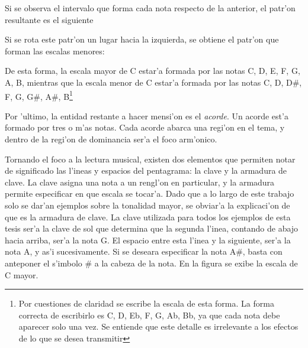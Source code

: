 Si se observa el intervalo que forma cada nota respecto de la anterior, el patr'on resultante es el siguiente

\begin{center}
      
\end{center}

Si se rota este patr'on un lugar hacia la izquierda, se obtiene el patr'on que forman las escalas menores:

\begin{center}
       
\end{center}

De esta forma, la escala mayor de C estar'a formada por las notas C, D, E, F, G, A, B, mientras que la escala menor de C estar'a formada
por las notas C, D, D\#, F, G, G\#, A\#, B\footnote{Por cuestiones de claridad se escribe la escala de esta forma. La forma correcta
de escribirlo es C, D, Eb, F, G, Ab, Bb, ya que cada nota debe aparecer solo una vez. Se entiende que este detalle es irrelevante a los efectos
de lo que se desea transmitir}


Por 'ultimo, la entidad restante a hacer mensi'on es el \emph{acorde}. Un acorde est'a formado por tres o m'as notas. Cada acorde abarca una regi'on
en el tema, y dentro de la regi'on de dominancia ser'a el foco arm'onico.

Tornando el foco a la lectura musical, existen dos elementos que permiten notar de significado las l'ineas y espacios del pentagrama: la clave
y la armadura de clave. La clave asigna una nota a un rengl'on en particular, y la armadura permite especificar en que escala se tocar'a. 
Dado que a lo largo de este trabajo solo se dar'an ejemplos sobre la tonalidad mayor, se obviar'a la explicaci'on de que es la armadura de clave. 
La clave utilizada para todos los ejemplos de esta tesis ser'a la clave de sol que determina que la segunda l'inea, contando de abajo hacia
arriba, ser'a la nota G. El espacio entre esta l'inea y la siguiente, ser'a la nota A, y as'i sucesivamente. Si se deseara especificar
la nota A\#, basta con anteponer el s'imbolo \# a la cabeza de la nota. En la figura \label{fig:escala_mayor} se exibe la escala de C mayor.


\begin{imagen}
    \width{12cm}
\end{imagen}
